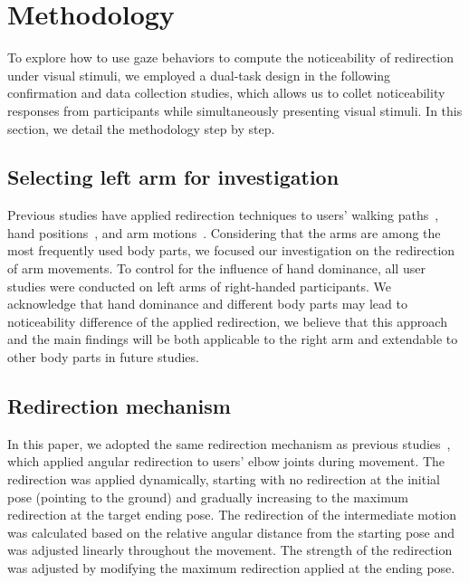 
\section{Methodology}
\label{section:methodology}

To explore how to use gaze behaviors to compute the noticeability of redirection under visual stimuli, we employed a dual-task design in the following confirmation and data collection studies, which allows us to collet noticeability responses from participants while simultaneously presenting visual stimuli. 
In this section, we detail the methodology step by step.

\subsection{Selecting left arm for investigation}

Previous studies have applied redirection techniques to users' walking paths~\cite{kohli2012redirected}, hand positions~\cite{wentzel2020improving}, and arm motions~\cite{poupyrev1996go}.
Considering that the arms are among the most frequently used body parts, we focused our investigation on the redirection of arm movements.
To control for the influence of hand dominance, all user studies were conducted on left arms of right-handed participants.
We acknowledge that hand dominance and different body parts may lead to noticeability difference of the applied redirection, we believe that this approach and the main findings will be both applicable to the right arm and extendable to other body parts in future studies.

\subsection{Redirection mechanism}

In this paper, we adopted the same redirection mechanism as previous studies~\cite{li2022modeling}, which applied angular redirection to users' elbow joints during movement. 
The redirection was applied dynamically, starting with no redirection at the initial pose (pointing to the ground) and gradually increasing to the maximum redirection at the target ending pose.
The redirection of the intermediate motion was calculated based on the relative angular distance from the starting pose and was adjusted linearly throughout the movement.
The strength of the redirection was adjusted by modifying the maximum redirection applied at the ending pose.

